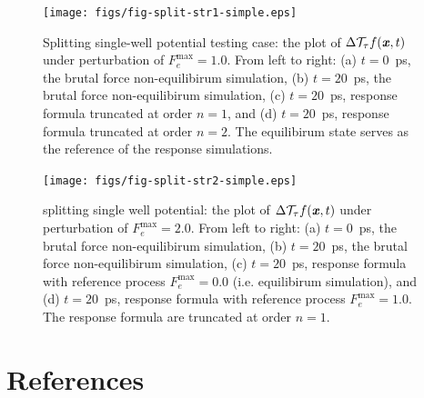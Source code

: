\documentclass[aip,jcp,a4paper,reprint,onecolumn]{revtex4-1}
\newcommand{\vect}[1]{\textbf{\textit{#1}}}
\newcommand{\mt}{\mathcal T}
\begin{document}
\begin{figure}
  \centering
  \texttt{[image: figs/fig-split-str1-simple.eps]}
  \caption{
    Splitting single-well potential testing case:
    the plot of $\Delta\mt_\tau f(\vect x,t)$  under perturbation of
    $F_e^{\textrm{max}} = 1.0$.
    From left to right:
    (a) $t=0$~\textsf{ps},
    the brutal force non-equilibirum simulation,
    (b) $t=20$~\textsf{ps},
    the brutal force non-equilibirum simulation,
    (c) $t=20$~\textsf{ps},
    response formula truncated at order $n=1$,
    and
    (d) $t=20$~\textsf{ps},
    response formula truncated at order $n=2$.
    The equilibirum state serves as the reference of
    the response simulations.
  }
  \label{fig:new-tmp5}
\end{figure}


\begin{figure}
  \centering
  \texttt{[image: figs/fig-split-str2-simple.eps]}
  \caption{
    splitting single well potential:
    the plot of $\Delta\mt_\tau f(\vect x,t)$  under perturbation of
    $F_e^{\textrm{max}} = 2.0$.
    From left to right:
    (a) $t=0$~\textsf{ps},
    the brutal force non-equilibirum simulation,
    (b) $t=20$~\textsf{ps},
    the brutal force non-equilibirum simulation,
    (c) $t=20$~\textsf{ps},
    response formula with reference process $F_e^{\max} = 0.0$
    (i.e. equilibirum simulation),
    and
    (d) $t=20$~\textsf{ps},
    response formula with reference process $F_e^{\max} = 1.0$.
    The response formula are truncated at order $n=1$.
  }
  \label{fig:new-tmp6}
\end{figure}







\section*{References}
{}

\end{document}
